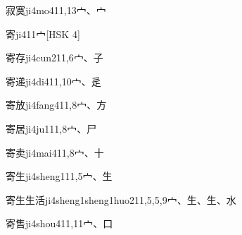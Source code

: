 \begin{EntryWithPhonetic}{寂寞}{ji4mo4}{11,13}{⼧、⼧}
\end{EntryWithPhonetic}

\begin{EntryWithPhonetic}{寄}{ji4}{11}{⼧}[HSK 4]
\end{EntryWithPhonetic}

\begin{EntryWithPhonetic}{寄存}{ji4cun2}{11,6}{⼧、⼦}
\end{EntryWithPhonetic}

\begin{EntryWithPhonetic}{寄递}{ji4di4}{11,10}{⼧、⾡}
\end{EntryWithPhonetic}

\begin{EntryWithPhonetic}{寄放}{ji4fang4}{11,8}{⼧、⽅}
\end{EntryWithPhonetic}

\begin{EntryWithPhonetic}{寄居}{ji4ju1}{11,8}{⼧、⼫}
\end{EntryWithPhonetic}

\begin{EntryWithPhonetic}{寄卖}{ji4mai4}{11,8}{⼧、⼗}
\end{EntryWithPhonetic}

\begin{EntryWithPhonetic}{寄生}{ji4sheng1}{11,5}{⼧、⽣}
\end{EntryWithPhonetic}

\begin{EntryWithPhonetic}{寄生生活}{ji4sheng1sheng1huo2}{11,5,5,9}{⼧、⽣、⽣、⽔}
\end{EntryWithPhonetic}

\begin{EntryWithPhonetic}{寄售}{ji4shou4}{11,11}{⼧、⼝}
\end{EntryWithPhonetic}

